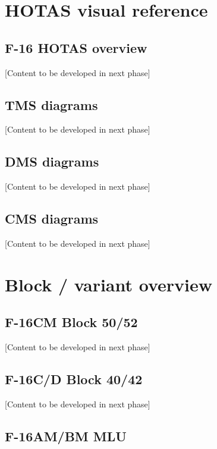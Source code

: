 \documentclass[11pt,a4paper]{article}
\begin{document}
\section{HOTAS visual reference}

\subsection{F-16 HOTAS overview}

[Content to be developed in next phase]

\subsection{TMS diagrams}

[Content to be developed in next phase]

\subsection{DMS diagrams}

[Content to be developed in next phase]

\subsection{CMS diagrams}

[Content to be developed in next phase]


\appendix

\section{Block / variant overview}

\subsection{F-16CM Block 50/52}

[Content to be developed in next phase]

\subsection{F-16C/D Block 40/42}

[Content to be developed in next phase]

\subsection{F-16AM/BM MLU}
\end{document}
